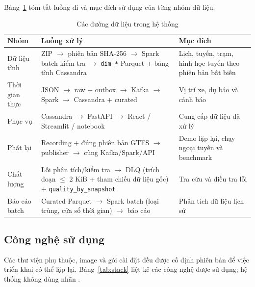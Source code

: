 Bảng~\ref{tab:paths} tóm tắt luồng đi và mục đích sử dụng của từng nhóm dữ liệu.

\begin{table}[H]
\centering
\tablefont
\caption{Các đường dữ liệu trong hệ thống}
\label{tab:paths}
\begin{tabular}{p{2.32cm}p{8.34cm}p{4.46cm}}
\toprule
\textbf{Nhóm} & \textbf{Luồng xử lý} & \textbf{Mục đích} \\
\midrule
Dữ liệu tĩnh & ZIP $\rightarrow$ phiên bản SHA-256 $\rightarrow$ Spark batch kiểm tra $\rightarrow$ \texttt{dim\_*} Parquet + bảng tĩnh Cassandra & Lịch, tuyến, trạm, hình học tuyến theo phiên bản bất biến \\
Thời gian thực & JSON $\rightarrow$ raw + outbox $\rightarrow$ Kafka $\rightarrow$ Spark $\rightarrow$ Cassandra + curated & Vị trí xe, dự báo và cảnh báo \\
Phục vụ & Cassandra $\rightarrow$ FastAPI $\rightarrow$ React / Streamlit / notebook & Cung cấp dữ liệu đã xử lý \\
Phát lại & Recording + đúng phiên bản GTFS $\rightarrow$ publisher $\rightarrow$ cùng Kafka/Spark/API & Demo lặp lại, chạy ngoại tuyến và benchmark \\
Chất lượng & Lỗi phân tích/kiểm tra $\rightarrow$ DLQ (trích đoạn $\le$ 2 KiB + tham chiếu dữ liệu gốc) + \texttt{quality\_by\_snapshot} & Tra cứu và điều tra lỗi \\
Báo cáo batch & Curated Parquet $\rightarrow$ Spark batch (loại trùng, cửa sổ thời gian) $\rightarrow$ báo cáo & Phân tích dữ liệu lịch sử \\
\bottomrule
\end{tabular}
\end{table}

\subsection{Công nghệ sử dụng}

Các thư viện phụ thuộc, image và gói cài đặt đều được cố định phiên bản để việc triển khai có thể lặp lại. Bảng~\ref{tab:stack} liệt kê các công nghệ được sử dụng; hệ thống không dùng nhãn .

